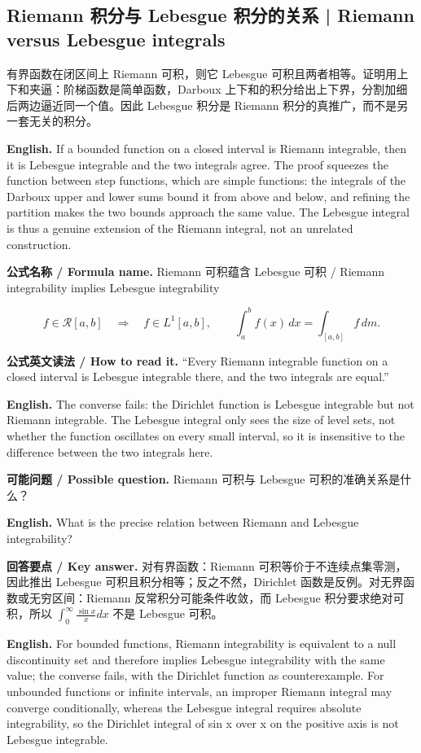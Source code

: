\documentclass[UTF8,11pt,a4paper]{ctexart}
\newcommand{\EN}[1]{\par\noindent\textbf{English.} #1\par}
\newcommand{\READ}[1]{\par\noindent\textbf{公式英文读法 / How to read it.} #1\par}
\let\APSsubsection\subsection
\renewcommand{\subsection}[1]{\Needspace{6\baselineskip}\APSsubsection{#1}}
\newcommand{\FORMULA}[2]{\par\Needspace{3\baselineskip}\noindent\textbf{公式名称 / Formula name.} #1 / #2\par}
\newcommand{\ASK}[4]{\par\noindent\textbf{可能问题 / Possible question.} #1\par\EN{#2}\noindent\textbf{回答要点 / Key answer.} #3\par\EN{#4}\medskip}
\begin{document}
\subsection{Riemann 积分与 Lebesgue 积分的关系 | Riemann versus Lebesgue integrals}
\noindent 有界函数在闭区间上 Riemann 可积，则它 Lebesgue 可积且两者相等。证明用上下和夹逼：阶梯函数是简单函数，Darboux 上下和的积分给出上下界，分割加细后两边逼近同一个值。因此 Lebesgue 积分是 Riemann 积分的真推广，而不是另一套无关的积分。
\EN{If a bounded function on a closed interval is Riemann integrable, then it is Lebesgue integrable and the two integrals agree. The proof squeezes the function between step functions, which are simple functions: the integrals of the Darboux upper and lower sums bound it from above and below, and refining the partition makes the two bounds approach the same value. The Lebesgue integral is thus a genuine extension of the Riemann integral, not an unrelated construction.}
\FORMULA{Riemann 可积蕴含 Lebesgue 可积}{Riemann integrability implies Lebesgue integrability}
\[
f\in\mathcal R[a,b]
\quad\Longrightarrow\quad
f\in L^1[a,b],
\qquad
\int_a^b f(x)\,dx=\int_{[a,b]}f\,dm.
\]
\READ{“Every Riemann integrable function on a closed interval is Lebesgue integrable there, and the two integrals are equal.”}
\EN{The converse fails: the Dirichlet function is Lebesgue integrable but not Riemann integrable. The Lebesgue integral only sees the size of level sets, not whether the function oscillates on every small interval, so it is insensitive to the difference between the two integrals here.}
\ASK{Riemann 可积与 Lebesgue 可积的准确关系是什么？}{What is the precise relation between Riemann and Lebesgue integrability?}{对有界函数：Riemann 可积等价于不连续点集零测，因此推出 Lebesgue 可积且积分相等；反之不然，Dirichlet 函数是反例。对无界函数或无穷区间：Riemann 反常积分可能条件收敛，而 Lebesgue 积分要求绝对可积，所以 $\int_0^\infty\frac{\sin x}{x}dx$ 不是 Lebesgue 可积。}{For bounded functions, Riemann integrability is equivalent to a null discontinuity set and therefore implies Lebesgue integrability with the same value; the converse fails, with the Dirichlet function as counterexample. For unbounded functions or infinite intervals, an improper Riemann integral may converge conditionally, whereas the Lebesgue integral requires absolute integrability, so the Dirichlet integral of sin x over x on the positive axis is not Lebesgue integrable.}
\end{document}
